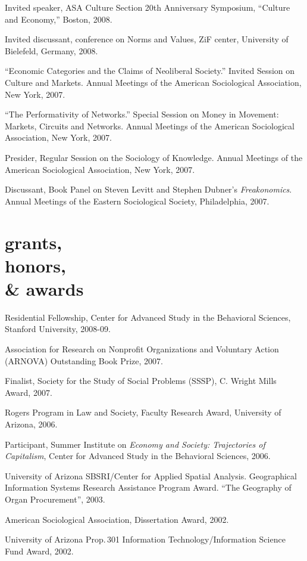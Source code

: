 \documentclass[11pt,oneside,a4paper,DIV=8]{scrartcl}
\begin{document}
Invited speaker, ASA Culture Section 20th Anniversary Symposium, ``Culture and Economy,'' Boston, 2008.

Invited discussant, conference on Norms and Values, ZiF center, University of Bielefeld, Germany, 2008. 

``Economic Categories and the Claims of Neoliberal Society.'' Invited Session on Culture and Markets. Annual Meetings of the American Sociological Association, New York, 2007.

``The Performativity of Networks.'' Special Session on Money in Movement: Markets, Circuits and Networks. Annual Meetings of the American Sociological Association, New York, 2007.

Presider, Regular Session on the Sociology of Knowledge. Annual Meetings of the American Sociological Association, New York, 2007. 

Discussant, Book Panel on Steven Levitt and Stephen Dubner's \emph{Freakonomics}. Annual Meetings of the Eastern Sociological Society, Philadelphia, 2007. 

 

\section{grants,\\ honors, \\ \& awards}


Residential Fellowship, Center for Advanced Study in the Behavioral Sciences, Stanford University, 2008-09.

Association for Research on Nonprofit Organizations and Voluntary Action (ARNOVA) Outstanding Book Prize, 2007.

Finalist, Society for the Study of Social Problems (SSSP), C. Wright Mills Award, 2007.

Rogers Program in Law and Society, Faculty Research Award, University of Arizona, 2006.

Participant, Summer Institute on \emph{Economy and Society: Trajectories of Capitalism}, Center for Advanced Study in the Behavioral Sciences, 2006.

University of Arizona SBSRI/Center for Applied Spatial
Analysis. Geographical Information Systems Research Assistance
Program Award. ``The Geography of Organ Procurement'', 2003.

American Sociological Association, Dissertation Award, 2002.

University of Arizona Prop.\,301 Information Technology/Information Science Fund Award, 2002.
\end{document}
